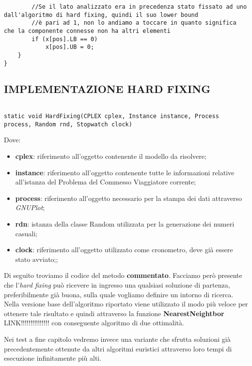 \documentclass[11pt]{article}
\begin{document}
\begin{lstlisting}
        //Se il lato analizzato era in precedenza stato fissato ad uno dall'algoritmo di hard fixing, quindi il suo lower bound
        //è pari ad 1, non lo andiamo a toccare in quanto significa che la componente connesse non ha altri elementi
        if (x[pos].LB == 0)
            x[pos].UB = 0;
    }
}

\end{lstlisting}

\subsection*{IMPLEMENTAZIONE HARD FIXING}
\label{sec:ImplHardFixingS}

\begin{lstlisting}

static void HardFixing(CPLEX cplex, Instance instance, Process process, Random rnd, Stopwatch clock)

\end{lstlisting}

Dove:

\begin{itemize}
    \item \textbf{cplex}: riferimento all'oggetto contenente il modello da risolvere;
    \item \textbf{instance}: riferimento all'oggetto contenente tutte le informazioni relative all'istanza del Problema del Commesso Viaggiatore corrente;
    \item \textbf{process}: riferimento all'oggetto necessario per la stampa dei dati attraverso \textit{GNUPlot};
    \item \textbf{rdn}: istanza della classe Random utilizzata per la generazione dei numeri casuali;
    \item \textbf{clock}: riferimento all'oggetto utilizzato come cronometro, deve già essere stato avviato;;
\end{itemize}

Di seguito troviamo il codice del metodo \textbf{commentato}. Facciamo però presente che l'\textit{hard fixing} può ricevere in ingresso una qualsiasi soluzione di partenza, preferibilmente già buona, sulla quale vogliamo definire un intorno di ricerca. Nella versione base dell'algoritmo riportato viene utilizzato il modo più veloce per ottenere tale risultato e quindi attraverso la funzione \textbf{NearestNeightbor} LINK!!!!!!!!!!!!!!! con conseguente algoritmo di due ottimalità.

Nei test a fine capitolo vedremo invece una variante che sfrutta soluzioni già precedentemente ottenute da altri algoritmi euristici attraverso loro tempi di esecuzione infinitamente più alti.
\end{document}

